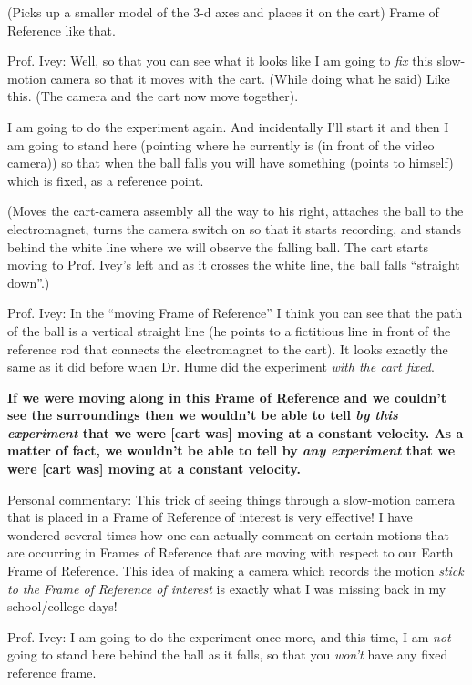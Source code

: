 \documentclass[a6paper]{article}
\newcommand{\perscom}[1]{
    {\footnotesize Personal commentary:  #1}
}
\begin{document}
(Picks up a smaller model of the 3-d axes and places it on the cart) Frame of Reference like that. 

Prof. Ivey: Well, so that you can see what it looks like I am going to \emph{fix} this slow-motion camera so that it moves with the cart. (While doing what he said) Like this. (The camera and the cart now move together).

I am going to do the experiment again. And incidentally I'll start it and then I am going to stand here (pointing where he currently is (in front of the video camera)) so that when the ball falls you will have something (points to himself) which is fixed, as a reference point. 

(Moves the cart-camera assembly all the way to his right, attaches the ball to the electromagnet, turns the camera switch on so that it starts recording, and stands behind the white line where we will observe the falling ball. The cart starts moving to Prof. Ivey's left and as it crosses the white line, the ball falls ``straight down''.)

Prof. Ivey: In the ``moving Frame of Reference'' I think you can see that the path of the ball is a vertical straight line (he points to a fictitious line in front of the reference rod that connects the electromagnet to the cart). It looks exactly the same as it did before when Dr. Hume did the experiment \emph{with the cart fixed}.

\textbf{If we were moving along in this Frame of Reference and we couldn't see the surroundings then we wouldn't be able to tell \emph{by this experiment} that we were [cart was] moving at a constant velocity. As a matter of fact, we wouldn't be able to tell by \emph{any experiment} that we were [cart was] moving at a constant velocity.}

\perscom{ This trick of seeing things through a slow-motion camera that is placed in a Frame of Reference of interest is very effective! I have wondered several times how one can actually comment on certain motions that are occurring in Frames of Reference that are moving with respect to our Earth Frame of Reference. This idea of making a camera which records the motion \emph{stick to the Frame of Reference of interest} is exactly what I was missing back in my school/college days!}

Prof. Ivey: I am going to do the experiment once more, and this time, I am \emph{not} going to stand here behind the ball as it falls, so that you \emph{won't} have any fixed reference frame.
\end{document}
